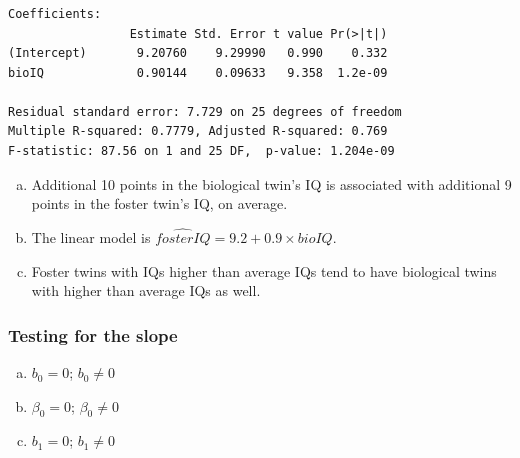 \documentclass[notes,11pt, aspectratio=169]{beamer}
\begin{document}
\begin{frame}[fragile]
\frametitle{}


{\footnotesize
\begin{verbatim}
Coefficients:
                 Estimate Std. Error t value Pr(>|t|)    
(Intercept)       9.20760    9.29990   0.990    0.332    
bioIQ             0.90144    0.09633   9.358  1.2e-09

Residual standard error: 7.729 on 25 degrees of freedom
Multiple R-squared: 0.7779,	Adjusted R-squared: 0.769 
F-statistic: 87.56 on 1 and 25 DF,  p-value: 1.204e-09 
\end{verbatim}
}

\begin{enumerate}[(a)]
\item Additional 10 points in the biological twin's IQ is associated with additional 9 points in the foster twin's IQ, on average.
\item The linear model is $\widehat{fosterIQ} = 9.2 + 0.9 \times bioIQ$.
\item Foster twins with IQs higher than average IQs tend to have biological twins with higher than average IQs as well.
\end{enumerate}

\end{frame}


\begin{frame}
\frametitle{Testing for the slope}


\begin{enumerate}[(a)]
\item {} $b_0 = 0$;  $b_0 \ne 0$ 
\item {} $\beta_0 = 0$;  $\beta_0 \ne 0$ 
\item {} $b_1 = 0$;  $b_1 \ne 0$ 
\end{enumerate}

\end{frame}
\end{document}
